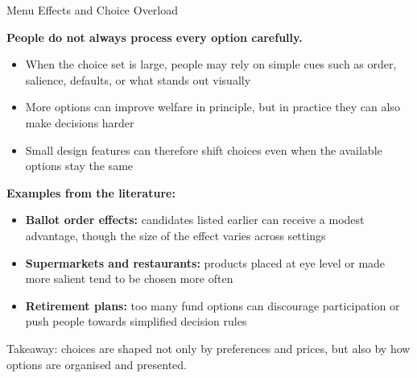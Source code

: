 \documentclass[10pt]{beamer}
\begin{document}
\begin{frame}[allowframebreaks]{Menu Effects and Choice Overload}

\textbf{People do not always process every option carefully.}

\begin{itemize}
\item When the choice set is large, people may rely on simple cues such as order, salience, defaults, or what stands out visually
\item More options can improve welfare in principle, but in practice they can also make decisions harder
\item Small design features can therefore shift choices even when the available options stay the same
\end{itemize}


\textbf{Examples from the literature:}
\begin{itemize}
\item \textbf{Ballot order effects:} candidates listed earlier can receive a modest advantage, though the size of the effect varies across settings
\item \textbf{Supermarkets and restaurants:} products placed at eye level or made more salient tend to be chosen more often
\item \textbf{Retirement plans:} too many fund options can discourage participation or push people towards simplified decision rules
\end{itemize}


\alert{Takeaway:} choices are shaped not only by preferences and prices, but also by how options are organised and presented.
\end{frame}
\end{document}
